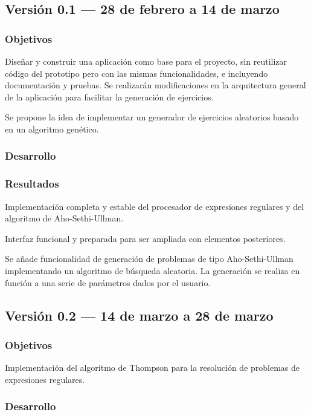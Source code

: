 \subsection{Versión 0.1 --- 28 de febrero a 14 de marzo}

\subsubsection{Objetivos}
Diseñar y construir una aplicación como base para el proyecto, sin reutilizar código del prototipo pero con las mismas funcionalidades, e incluyendo documentación y pruebas.
Se realizarán modificaciones en la arquitectura general de la aplicación para facilitar la generación de ejercicios.

Se propone la idea de implementar un generador de ejercicios aleatorios basado en un algoritmo genético.

\subsubsection{Desarrollo}

\subsubsection{Resultados}
Implementación completa y estable del procesador de expresiones regulares y del algoritmo de Aho-Sethi-Ullman.

Interfaz funcional y preparada para ser ampliada con elementos posteriores.

Se añade funcionalidad de generación de problemas de tipo Aho-Sethi-Ullman implementando un algoritmo de búsqueda aleatoria.
La generación se realiza en función a una serie de parámetros dados por el usuario.

\subsection{Versión 0.2 --- 14 de marzo a 28 de marzo}

\subsubsection{Objetivos}
Implementación del algoritmo de Thompson para la resolución de problemas de expresiones regulares.

\subsubsection{Desarrollo}

